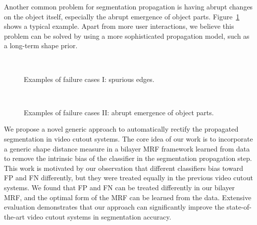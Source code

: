 \documentclass[10pt,journal,compsoc]{newIEEEtran}
\begin{document}
Another common problem for segmentation propagation is having abrupt changes on the object itself, especially the abrupt emergence of object parts. Figure~\ref{FIG:SuddenParts} shows a typical example. Apart from more user interactions, we believe this problem can be solved by using a more sophisticated propagation model, such as a long-term shape prior.


\begin{figure}[!h]
	\centering
	\\\vspace{-2mm}
	\caption{Examples of failure cases I: spurious edges.}\label{FIG:SpuriousEdge}\vspace{-3mm}
	\centering
	\\\vspace{-2mm}
	\caption{Examples of failure cases II: abrupt emergence of object parts.}\label{FIG:SuddenParts}
\end{figure}%
We propose a novel generic approach to automatically rectify the propagated segmentation in video cutout systems. The core idea of our work is to incorporate a generic shape distance measure in a bilayer MRF framework learned from data to remove the intrinsic bias of the classifier in the segmentation propagation step. This work is motivated by our observation that different classifiers bias toward FP and FN differently, but they were treated equally in the previous video cutout systems. We found that FP and FN can be treated differently in our bilayer MRF, and the optimal form of the MRF can be learned from the data. Extensive evaluation demonstrates that our approach can significantly improve the state-of-the-art video cutout systems in segmentation accuracy.  
\end{document}
